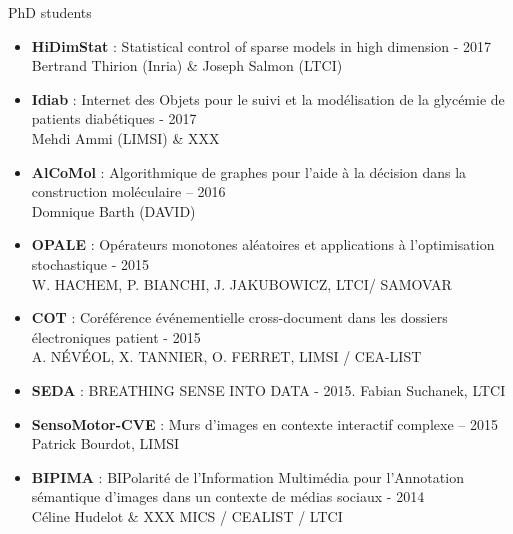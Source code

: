 \begin{frame}{PhD students}

\begin{itemize}
\item 
\small
\textbf{HiDimStat} : Statistical control of sparse models in high dimension - 2017
\\
Bertrand Thirion (Inria) \& Joseph Salmon (LTCI)
\item
\textbf{Idiab} : Internet des Objets pour le suivi et la modélisation de la glycémie de patients
diabétiques - 2017
\\
Mehdi Ammi (LIMSI) \& XXX
\item
\textbf{AlCoMol} : Algorithmique de graphes pour l’aide à la décision dans la construction
moléculaire – 2016
\\
Domnique Barth (DAVID)
\item 
\textbf{OPALE} : Opérateurs monotones aléatoires et applications à l’optimisation stochastique -
2015
\\
W. HACHEM, P. BIANCHI, J. JAKUBOWICZ, LTCI/ SAMOVAR
\item 
\textbf{COT} : Coréférence événementielle cross-document dans les dossiers électroniques
patient - 2015
\\
A. NÉVÉOL, X. TANNIER, O. FERRET, LIMSI / CEA-LIST
\item 
\textbf{SEDA} : BREATHING SENSE INTO DATA - 2015. Fabian Suchanek, LTCI
\item 
\textbf{SensoMotor-CVE} : Murs d'images en contexte interactif complexe – 2015
\\
Patrick Bourdot, LIMSI
\item
\textbf{BIPIMA} : BIPolarité de l'Information Multimédia pour l'Annotation sémantique d'images
dans un contexte de médias sociaux - 2014
\\
Céline Hudelot \& XXX  MICS / CEALIST / LTCI
\end{itemize}
\end{frame}

